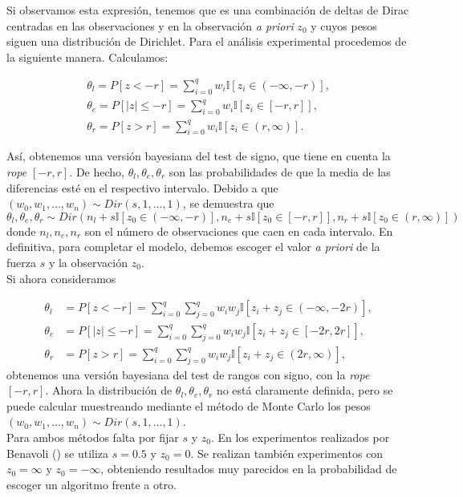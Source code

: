 	Si observamos esta expresión, tenemos que es una 
combinación de deltas de Dirac centradas en las observaciones
y en la observación \textit{a priori} $z_0$ y cuyos pesos
siguen una distribución de Dirichlet. Para el análisis
experimental procedemos de la siguiente manera. Calculamos:

\begin{align*}
	\theta_l = P[ z < -r ] = 
				\sum\limits_{i = 0}^q 
					w_i \mathbb{I}[ z_i \in (-\infty,-r)],\\
	\theta_e = P[ |z| \leq -r ] = 
				\sum\limits_{i = 0}^q 
					w_i \mathbb{I}[ z_i \in [-r,r]], \\
	\theta_r = P[ z > r ] = 
				\sum\limits_{i = 0}^q 
					w_i \mathbb{I}[ z_i \in (r, \infty)].
\end{align*}

	Así, obtenemos una versión bayesiana del test de signo, 
que tiene en cuenta la \textit{rope} $[-r,r]$. De hecho, $\theta_l,
\theta_e, \theta_r$ son las probabilidades de que la media
de las diferencias esté en el respectivo intervalo. 
Debido a que $(w_0, w_1, \dots, w_n) \sim Dir(s,1, \dots, 
1)$, se demuestra que
	\[ 
		\theta_l,\theta_e, \theta_r \sim
		Dir(n_l + s \mathbb{I}[ z_0 \in (-\infty,-r) ],
			n_e + s \mathbb{I}[ z_0 \in [-r,r] ],
			n_r + s \mathbb{I}[ z_0 \in (r, \infty) ])
	\]
	donde $n_l, n_e, n_r$ son el número de observaciones 
que caen en cada intervalo. En definitiva, para 
completar el modelo, debemos escoger el valor \textit{a 
priori} de la fuerza $s$ y la observación $z_0$.\\

	Si ahora consideramos
	
\begin{align*}
	\theta_l &= P[ z < -r ] = 
				\sum\limits_{i = 0}^q 
				\sum\limits_{j = 0}^q 
					w_i w_j 
					\mathbb{I}[ z_i + z_j 
								\in (-\infty,-2r)],\\
	\theta_e &= P[ |z| \leq -r ] = 
				\sum\limits_{i = 0}^q 
				\sum\limits_{j = 0}^q 
					w_i w_j 
					\mathbb{I}[ z_i + z_j 
								\in [-2r,2r]], \\
	\theta_r &= P[ z > r ] = 
				\sum\limits_{i = 0}^q 
				\sum\limits_{j = 0}^q 
					w_i w_j 
					\mathbb{I}[ z_i + z_j 
								\in (2r, \infty)],
\end{align*}
	obtenemos una versión bayesiana del 
test de rangos con signo, con la \textit{rope} $[-r,r]$. 
Ahora la distribución de 
$\theta_l, \theta_e, \theta_r$ no está claramente definida,
pero se puede calcular muestreando mediante el método
de Monte Carlo los pesos $(w_0, w_1, \dots, w_n) \sim 
Dir(s,1, \dots, 1)$.\\
	Para ambos métodos falta por fijar $s$ y $z_0$. 
En los experimentos realizados por Benavoli 
(\cite{BENAVOLI16}) se utiliza $s=0.5$ y $z_0=0$. Se realizan 
también experimentos con $z_0 = \infty$ y $z_0 = -\infty$, 
obteniendo resultados muy parecidos en la probabilidad
de escoger un algoritmo frente a otro.


